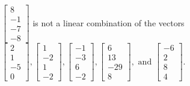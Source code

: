 \begin{exercise}
\begin{exerciseStatement}
  \end{exerciseStatement}
  \begin{exerciseAnswer}
   \(\left[\begin{array}{c}
8 \\
-1 \\
-7 \\
-8
\end{array}\right]\) 
  	 is not  
	a linear combination of the vectors \(\left[\begin{array}{c}
2 \\
1 \\
-5 \\
0
\end{array}\right] , \left[\begin{array}{c}
1 \\
-2 \\
1 \\
-2
\end{array}\right] , \left[\begin{array}{c}
-1 \\
-3 \\
6 \\
-2
\end{array}\right] , \left[\begin{array}{c}
6 \\
13 \\
-29 \\
8
\end{array}\right] , \text{ and } \left[\begin{array}{c}
-6 \\
2 \\
8 \\
4
\end{array}\right]\).

	
  


  \end{exerciseAnswer}
\end{exercise}